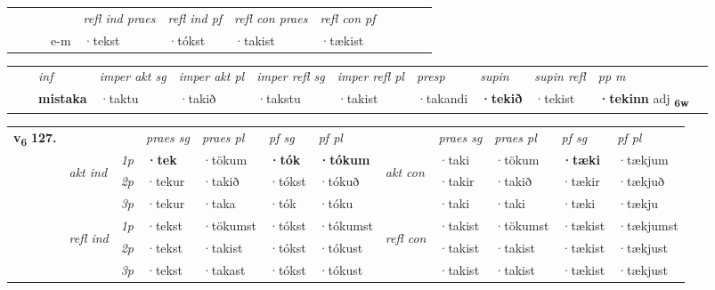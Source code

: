 \begin{tabular}{llllllllllll}
 & &  & &  \textit{refl ind praes} & \textit{refl ind pf} & \textit{refl con praes} & \textit{refl con pf} \\*
&  & & e-m & ·tekst & ·tókst & ·takist & ·tækist \\*
\cmidrule{5-9}
\end{tabular}


\begin{tabular}{llllllllllll}
 & & \textit{inf} & \textit{imper akt sg} & \textit{imper akt pl} & \textit{imper refl sg} & \textit{imper refl pl} & \textit{presp} & \textit{supin} & \textit{supin refl} & \textit{pp m}     \\*
  & & \textbf{mistaka} & ·taktu  & ·takið & ·takstu & ·takist & ·takandi &  \textbf{·tekið} & ·tekist & \textbf{·tekinn} adj \textbf{\textsubscript{6w}} \\*
\cmidrule{1-12}
\end{tabular}



\begin{tabular}{llllllllllll} \toprule
\multirow{4}{*}{{{\textbf{v{\textsubscript{6}}} \Large{\textbf{127.}}}}}  & &   &  \textit{praes sg}  & \textit{praes pl}  &\textit{ pf sg} & \textit{pf pl} &  &  \textit{praes sg}  & \textit{praes pl}  & \textit{pf sg} & \textit{pf pl } \\*
	\cmidrule{4-7} \cmidrule{9-12}
 & \multirow{3}{*}{\begin{turn}{90}\textit{akt ind}\end{turn}} & {\textit{1p}} & \textbf{·tek} & ·tökum    & \textbf{·tók} & \textbf{·tókum} & \multirow{3}{*}{\begin{turn}{90}\textit{akt con}\end{turn}} &·taki & ·tökum & \textbf{·tæki} & ·tækjum\\*
& &  {\textit{2p}} &  ·tekur  & ·takið   & ·tókst & ·tókuð & & ·takir & ·takið & ·tækir & ·tækjuð \\*
& &  {\textit{3p}} & ·tekur & ·taka   & ·tók & ·tóku & & ·taki & ·taki& ·tæki & ·tækju  \\*
\cmidrule{4-7} \cmidrule{9-12}
 &\multirow{3}{*}{\begin{turn}{90}\textit{refl ind}\end{turn}} & {\textit{1p}} & ·tekst & ·tökumst    & ·tókst & ·tókumst & \multirow{3}{*}{\begin{turn}{90}\textit{refl con}\end{turn}}  &·takist & ·tökumst & ·tækist & ·tækjumst\\*
 &&  {\textit{2p}} &  ·tekst  & ·takist   & ·tókst & ·tókust & &·takist & ·takist & ·tækist & ·tækjust \\*
& &  {\textit{3p}} & ·tekst & ·takast   & ·tókst & ·tókust & & ·takist & ·takist& ·tækist & ·tækjust  \\*
\cmidrule{4-7} \cmidrule{9-12}
\end{tabular}


